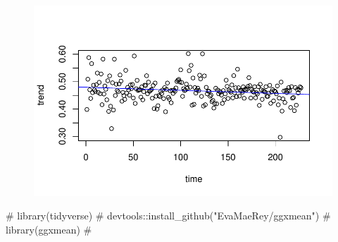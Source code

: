 \documentclass[
  letterpaper,
  DIV=11,
  numbers=noendperiod]{scrartcl}
\newenvironment{Shaded}{\begin{snugshade}}{\end{snugshade}}
\newcommand{\AttributeTok}[1]{\textcolor[rgb]{0.40,0.45,0.13}{#1}}
\newcommand{\CommentTok}[1]{\textcolor[rgb]{0.37,0.37,0.37}{#1}}
\newcommand{\DecValTok}[1]{\textcolor[rgb]{0.68,0.00,0.00}{#1}}
\newcommand{\FunctionTok}[1]{\textcolor[rgb]{0.28,0.35,0.67}{#1}}
\newcommand{\NormalTok}[1]{\textcolor[rgb]{0.00,0.23,0.31}{#1}}
\newcommand{\SpecialCharTok}[1]{\textcolor[rgb]{0.37,0.37,0.37}{#1}}
\newcommand{\StringTok}[1]{\textcolor[rgb]{0.13,0.47,0.30}{#1}}
\begin{document}
\begin{Shaded}
\end{Shaded}

\begin{figure}[H]

{\centering \includegraphics{Quarto_files/figure-pdf/unnamed-chunk-19-1.pdf}

}

\end{figure}

\begin{Shaded}
\begin{Highlighting}[]
\CommentTok{\# library(tidyverse)}
\CommentTok{\# devtools::install\_github("EvaMaeRey/ggxmean")}
\CommentTok{\# library(ggxmean)}
\CommentTok{\# }
\end{Highlighting}
\end{Shaded}
\end{document}
